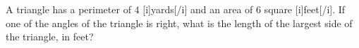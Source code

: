 A triangle has a perimeter of $4$ [i]yards[/i] and an area of $6$ square [i]feet[/i].  If one of the angles of the triangle is right, what is the length of the largest side of the triangle, in feet?